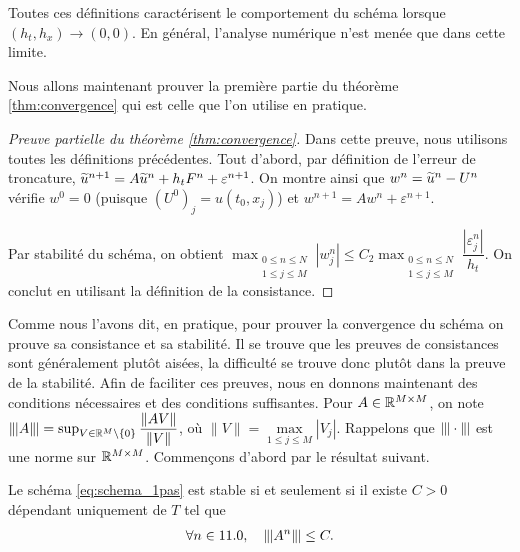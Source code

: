 \documentclass[12pt,a4paper,twoside]{article}
\begin{document}
\begin{remark}
  Toutes ces d\'efinitions caract\'erisent le comportement du sch\'ema 
  lorsque $(h_t,h_x) \to (0,0)$.
  En g\'en\'eral, l'analyse num\'erique n'est men\'ee que dans cette limite.
\end{remark}

Nous allons maintenant prouver la premi\`ere partie du th\'eor\`eme \ref{thm:convergence}
qui est celle que l'on utilise en pratique.
\begin{proof}[Preuve partielle du th\'eor\`eme \ref{thm:convergence}]
  Dans cette preuve, nous utilisons toutes les d\'efinitions pr\'ec\'edentes.
  Tout d'abord, par d\'efinition de l'erreur de troncature,
  $\widetilde{u}^{n+1} = A \widetilde{u}^n + h_t F^n + \varepsilon^{n+1}$.
  On montre ainsi que
  $w^n = \widetilde{u}^{n} - U^{n}$ v\'erifie $w^0 = 0$ 
  (puisque $(U^0)_j = u(t_0,x_j)$) et
  $w^{n+1} = A w^n + \varepsilon^{n+1}$.

  Par stabilit\'e du sch\'ema, on obtient
  $\max_{\substack{0\leq n \leq N\\ 1 \leq j \leq M}} | w_j^n |
  \leq C_2 \max_{\substack{0\leq n \leq N\\ 1 \leq j \leq M}} \dfrac{| \varepsilon_j^n |}{h_t}$.
  On conclut en utilisant la d\'efinition de la consistance.
\end{proof}



Comme nous l'avons dit, en pratique, pour prouver la convergence du sch\'ema
on prouve sa consistance et sa stabilit\'e.
Il se trouve que les preuves de consistances sont g\'en\'eralement plut\^ot
ais\'ees, la difficult\'e se trouve donc plut\^ot dans la preuve de la stabilit\'e.
Afin de faciliter ces preuves,
nous en donnons maintenant des conditions n\'ecessaires et des conditions
suffisantes.
Pour $A \in \mathbb{R}^{M \times M}$, on note 
$\|\!\;\!| A \|\!\;\!| = \sup_{V \in \mathbb{R}^{M} \backslash\{0\}} \dfrac{\| A V \|}{\| V \|}$,
o\`u $\| V \| = \max\limits_{1 \leq j \leq M} | V_j |$.
Rappelons que $\|\!\;\!| \cdot \|\!\;\!|$ est une norme sur $\mathbb{R}^{M \times M}$.
Commen\c{c}ons d'abord par le r\'esultat suivant.
\begin{proposition}
  \label{prop:carac_stab}
  Le sch\'ema \eqref{eq:schema_1pas} est stable si et seulement si
  il existe $C>0$ d\'ependant uniquement de $T$ tel que
  \begin{align}
    \label{eq:carac_stab}
    \forall n \in 11.0 , \quad \|\!\;\!| A^n \|\!\;\!| \leq C .
  \end{align}
\end{proposition}
\end{document}
